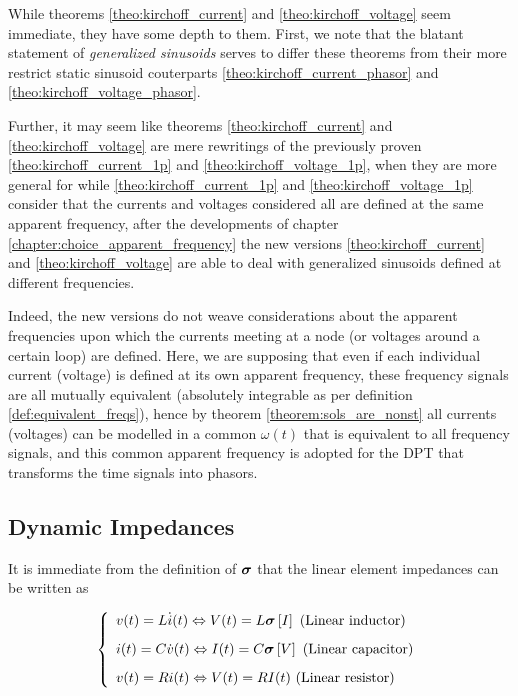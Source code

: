 	While theorems \ref{theo:kirchoff_current} and \ref{theo:kirchoff_voltage} seem immediate, they have some depth to them. First, we note that the blatant statement of \textit{generalized sinusoids} serves to differ these theorems from their more restrict static sinusoid couterparts \ref{theo:kirchoff_current_phasor} and \ref{theo:kirchoff_voltage_phasor}.

	Further, it may seem like theorems \ref{theo:kirchoff_current} and \ref{theo:kirchoff_voltage} are mere rewritings of the previously proven \ref{theo:kirchoff_current_1p} and \ref{theo:kirchoff_voltage_1p}, when they are more general for while \ref{theo:kirchoff_current_1p} and \ref{theo:kirchoff_voltage_1p} consider that the currents and voltages considered all are defined at the same apparent frequency, after the developments of chapter \ref{chapter:choice_apparent_frequency} the new versions \ref{theo:kirchoff_current} and \ref{theo:kirchoff_voltage} are able to deal with generalized sinusoids defined at different frequencies.

	Indeed, the new versions do not weave considerations about the apparent frequencies upon which the currents meeting at a node (or voltages around a certain loop) are defined. Here, we are supposing that even if each individual current (voltage) is defined at its own apparent frequency, these frequency signals are all mutually equivalent (absolutely integrable as per definition \ref{def:equivalent_freqs}), hence by theorem \ref{theorem:sols_are_nonst} all currents (voltages) can be modelled in a common $\omega(t)$ that is equivalent to all frequency signals, and this common apparent frequency is adopted for the DPT that transforms the time signals into phasors.

\subsection{Dynamic Impedances} %

	It is immediate from the definition of $\boldsymbol{\sigma}$ that the linear element impedances can be written as

\begin{equation}\left\{\begin{array}{l} v(t) = L\dot{i}(t) \Leftrightarrow V(t) = L \boldsymbol{\sigma} \left[I\right] \text{ (Linear inductor)}\\[3mm] i(t) = C\dot{v}(t) \Leftrightarrow I(t) = C \boldsymbol{\sigma} \left[V\right]  \text{ (Linear capacitor)}\\[3mm] v(t) = Ri(t) \Leftrightarrow V(t) = RI(t) \text{ (Linear resistor)}\end{array} \right. \label{sys:dpo_impedances}\end{equation}

